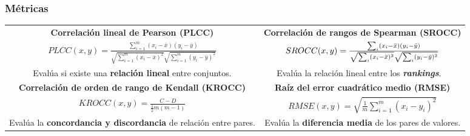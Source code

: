 \begin{frame}
  \frametitle{Métricas}
  \vspace{-.4cm}
  \begin{adjustwidth}{-.5cm}{}
  \begin{table}
      \setlength{\tabcolsep}{12pt}
  \begin{tabular}[l]{cc}
        \textbf{Correlación lineal de Pearson (PLCC)} 
        &
        \textbf{Correlación de rangos de Spearman (SROCC)} 
        \\
        \parbox[c]{6cm}{ 
   \centering
          $
  PLCC(x,y) = \frac{\sum_{i=1}^m (x_i - \bar x)(y_i - \bar y)}{\sqrt{\sum_{i=1}^m (x_i - \bar x)^2}\sqrt{\sum_{i=1}^m (y_i - \bar y)^2}}
        $ 
        \vspace{.3cm}
    }
& 
\parbox[c]{6cm}{
   \centering
   \vskip5pt
  $
  SROCC(x,y) = \frac{\sum_i (x_i - \bar x)(y_i - \bar y)}{\sqrt{\sum_i (x_i - \bar x)^2}\sqrt{\sum_i (y_i - \bar y)^2}}
        \vspace{.3cm}
$
}
\\ 
\parbox[c]{5cm}{
  \centering
  \footnotesize
    Evalúa si existe una \textbf{relación lineal} entre conjuntos. 
    \vspace{.5cm}
}
&
\parbox[c]{5cm}{
  \centering
  \footnotesize
  Evalúa la relación lineal entre los \textbf{\emph{rankings}}.
  \vspace{.5cm}
    \
}
\\
\parbox[c]{5cm}{\centering \textbf{Correlación de orden de rango de Kendall (KROCC)}}
& 
\textbf{Raíz del error cuadrático medio (RMSE)} 
\\
 \parbox[c]{5cm}{
   \centering
   \vskip5pt
   $
  KROCC(x,y) = \frac{C-D}{\frac{1}{2} m (m-1)}
    $
        \vspace{.3cm}
  }
& 
\parbox[c]{5cm}{
  \centering
  $
  RMSE(x,y) = \sqrt{\frac{1}{m}\sum_{i=1}^m (x_i - y_i)^2}
  $
}
\\
\parbox[c]{5cm}{
  \centering
  \footnotesize
    Evalúa la \textbf{concordancia y discordancia} de relación entre pares.
  }
  & 
\parbox[c]{5cm}{
  \centering
  \footnotesize
  Evalúa la \textbf{diferencia media} de los pares de valores.
   
  }
  \\

      \end{tabular}
  \end{table}
\end{adjustwidth} 
\end{frame}


